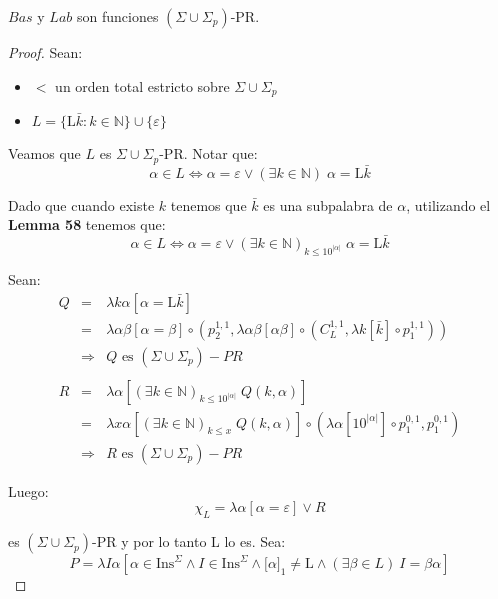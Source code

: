   \begin{lemma}
    \PN $Bas$ y $Lab$ son funciones $(\Sigma \cup \Sigma_{p})$-PR.
  \end{lemma}
  \begin{proof}
    \PN Sean:
    \begin{itemize}
      \item $<$ un orden total estricto sobre $\Sigma \cup \Sigma_{p}$
      \item $L = \{ \mathrm{L}\bar{k}:k\in \mathbb{N}\} \cup \{\varepsilon \}$
    \end{itemize}

    \PN Veamos que $L$ es $\Sigma \cup \Sigma_{p}$-PR. Notar que:
    \[
      \alpha \in L \Leftrightarrow \alpha = \varepsilon \vee (\exists k \in \mathbb{N}) \; \alpha = \mathrm{L}\bar{k}
    \]

    \PN Dado que cuando existe $k$ tenemos que $\bar{k}$ es una subpalabra de $\alpha $, utilizando el \textbf{Lemma 58}
    tenemos que:
    \[
      \alpha \in L \Leftrightarrow \alpha = \varepsilon \vee (\exists k \in \mathbb{N})_{k \leq 10^{\lvert \alpha
      \rvert}} \; \alpha = \mathrm{L}\bar{k}
    \]

    \PN Sean:
    \begin{eqnarray*}
      Q &=& \lambda k\alpha \left[\alpha = \mathrm{L}\bar{k}\right] \\
      &=& \lambda \alpha\beta \left[\alpha = \beta\right] \circ \left(p_{2}^{1,1}, \lambda \alpha\beta \left[\alpha\beta
        \right] \circ \left(C_{L}^{1,1},\lambda k \left[\bar{k}\right] \circ p_{1}^{1,1}\right)\right) \\
      &\Rightarrow& Q \text{ es } (\Sigma \cup \Sigma_{p})-PR \\
      \\
      R &=& \lambda \alpha \left[(\exists k \in \mathbb{N})_{k \leq 10^{\lvert \alpha \rvert}} \; Q(k,\alpha)\right] \\
      &=& \lambda x\alpha \left[(\exists k \in \mathbb{N})_{k \leq x} \; Q(k,\alpha)\right] \circ \left(\lambda \alpha
        \left[10^{\lvert \alpha \rvert}\right] \circ p_{1}^{0,1}, p_{1}^{0,1}\right) \\
      &\Rightarrow& R \text{ es } (\Sigma \cup \Sigma_{p})-PR
    \end{eqnarray*}

    \PN Luego:
    \[
      \chi_{L} = \lambda \alpha \left[\alpha = \varepsilon\right] \vee R
    \]

    \PN es $(\Sigma \cup \Sigma_{p})$-PR y por lo tanto L lo es. Sea:
    \[
      P = \lambda I\alpha \left[\alpha \in \mathrm{Ins}^{\Sigma} \wedge I \in \mathrm{Ins}^{\Sigma} \wedge \lbrack
      \alpha]_{1} \neq \mathrm{L} \wedge (\exists \beta \in L)\ I = \beta\alpha\right]
    \]


\end{proof}
